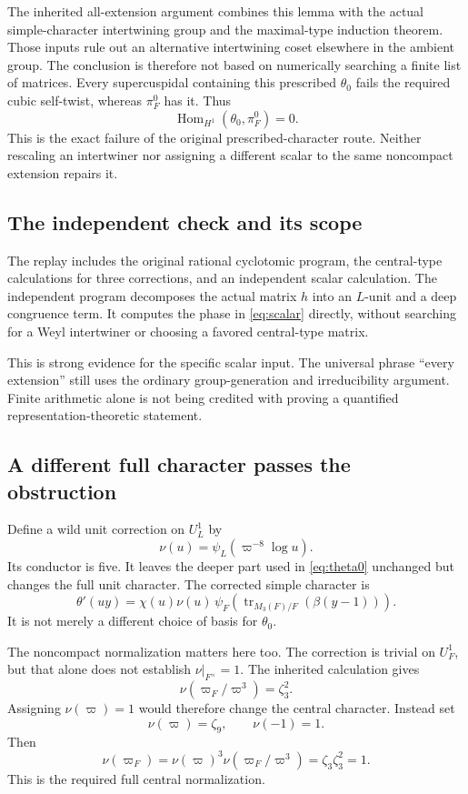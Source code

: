 \documentclass[11pt]{article}
\theoremstyle{definition}\newtheorem{definition}[proposition]{Definition}
\newcommand{\Hom}{\operatorname{Hom}}
\begin{document}
The inherited all-extension argument combines this lemma with the actual simple-character intertwining group and the maximal-type induction theorem. Those inputs rule out an alternative intertwining coset elsewhere in the ambient group. The conclusion is therefore not based on numerically searching a finite list of matrices. Every supercuspidal containing this prescribed $\theta_0$ fails the required cubic self-twist, whereas $\pi_F^0$ has it. Thus
\[
 \boxed{\Hom_{H^1}(\theta_0,\pi_F^0)=0.}
 \tag{18.3}\label{eq:nonoccurrence}
\]
This is the exact failure of the original prescribed-character route. Neither rescaling an intertwiner nor assigning a different scalar to the same noncompact extension repairs it.

\subsection{The independent check and its scope}
The replay includes the original rational cyclotomic program, the central-type calculations for three corrections, and an independent scalar calculation. The independent program decomposes the actual matrix $h$ into an $L$-unit and a deep congruence term. It computes the phase in \eqref{eq:scalar} directly, without searching for a Weyl intertwiner or choosing a favored central-type matrix.

This is strong evidence for the specific scalar input. The universal phrase ``every extension'' still uses the ordinary group-generation and irreducibility argument. Finite arithmetic alone is not being credited with proving a quantified representation-theoretic statement.

\subsection{A different full character passes the obstruction}
Define a wild unit correction on $U_L^1$ by
\[
 \nu(u)=\psi_L(\varpi^{-8}\log u).
 \tag{18.4}\label{eq:nu}
\]
Its conductor is five. It leaves the deeper part used in \eqref{eq:theta0} unchanged but changes the full unit character. The corrected simple character is
\[
 \theta'(uy)=\chi(u)\nu(u)\,
 \psi_F\!\left(\operatorname{tr}_{M_3(F)/F}(\beta(y-1))\right).
 \tag{18.5}\label{eq:theta-prime}
\]
It is not merely a different choice of basis for $\theta_0$.

The noncompact normalization matters here too. The correction is trivial on $U_F^1$, but that alone does not establish $\nu|_{F^\times}=1$. The inherited calculation gives
\[
 \nu(\varpi_F/\varpi^3)=\zeta_3^2.
\]
Assigning $\nu(\varpi)=1$ would therefore change the central character. Instead set
\[
 \nu(\varpi)=\zeta_9,\qquad\nu(-1)=1.
\]
Then
\[
 \nu(\varpi_F)=\nu(\varpi)^3\nu(\varpi_F/\varpi^3)
             =\zeta_3\zeta_3^2=1.
 \tag{18.6}\label{eq:nu-central}
\]
This is the required full central normalization.
\end{document}
